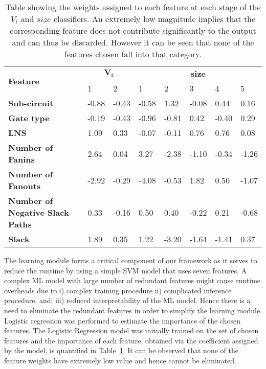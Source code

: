 \begin{table}[!t]
\caption{Table showing the weights assigned to each feature at each stage of the $V_t$ and $size$ classifiers. An extremely low magnitude implies that the corresponding feature does not contribute significantly to the output and can thus be discarded. However it can be seen that none of the features chosen fall into that category.}
\label{tab:tab7}

    \centering

\begin{tabular}{|l|l|l|l|l|l|l|l|}
\hline
    \multirow{2}{*}{\textbf{Feature}}       & \multicolumn{2}{c|}{$\mathbf{V_t}$} & \multicolumn{5}{c|}{\textbf{size}}             \\ \cline{2-8} 
                               & 1          & 2          & 1     & 2     & 3     & 4     & 5     \\ \hline
    \textbf{Sub-circuit}                    & -0.88      & -0.43      & -0.58 & 1.32  & -0.08 & 0.44  & 0.16  \\ \hline
    \textbf{Gate type}                      & -0.19      & -0.43      & -0.96 & -0.81 & 0.42  & -0.40 & 0.29  \\ \hline
    \textbf{LNS}                            & 1.09       & 0.33       & -0.07 & -0.11 & 0.76  & 0.76  & 0.08  \\ \hline
    \textbf{Number of Fanins}               & 2.64       & 0.04       & 3.27  & -2.38 & -1.10 & -0.34 & -1.26 \\ \hline
    \textbf{Number of Fanouts}              & -2.92      & -0.29      & -4.08 & -0.53 & 1.82  & 0.50  & -1.07 \\ \hline
    \textbf{Number of Negative Slack Paths} & 0.33       & -0.16      & 0.50  & 0.40  & -0.22 & 0.21  & -0.68 \\ \hline
    \textbf{Slack}                          & 1.89       & 0.35       & 1.22  & -3.20 & -1.64 & -1.41 & 0.37  \\ \hline
\end{tabular}

\end{table}


The learning module forms a critical component of our framework as it serves to reduce the runtime by using a simple SVM model that uses seven features.  A complex ML model with large number of redundant features might cause runtime overheads due to i) complex training procedure ii) complicated inference procedure, and; iii) reduced interpretability of the ML model. Hence there is a need to eliminate the redundant features in order to simplify the learning module. Logistic regression was performed to estimate the importance of the chosen features. The Logistic Regression model was initially trained on the set of chosen features and the importance of each feature,  obtained via the coefficient assigned by the model,  is quantified in Table~\ref{tab:tab7}.  It can be observed that none of the feature weights have extremely low value and hence cannot be eliminated.


